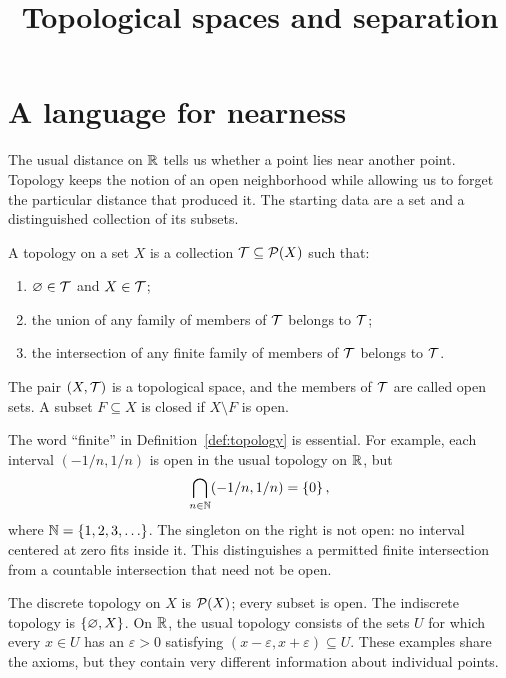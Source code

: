 \documentclass[11pt]{article}
\title{Topological spaces and separation}
\begin{document}
\maketitle

\section{A language for nearness}
The usual distance on $\mathbb{R}$ tells us whether a point lies near another
point. Topology keeps the notion of an open neighborhood while allowing us
to forget the particular distance that produced it. The starting data are
a set and a distinguished collection of its subsets.

\begin{definition}[Topology]\label{def:topology}
A topology on a set $X$ is a collection $\mathcal{T}\subseteq\mathcal{P}(X)$ such that:
\begin{enumerate}
  \item $\varnothing\in\mathcal{T}$ and $X\in\mathcal{T}$;
  \item the union of any family of members of $\mathcal{T}$ belongs to $\mathcal{T}$;
  \item the intersection of any finite family of members of $\mathcal{T}$ belongs to $\mathcal{T}$.
\end{enumerate}
The pair $(X,\mathcal{T})$ is a topological space, and the members of $\mathcal{T}$ are
called open sets. A subset $F\subseteq X$ is closed if $X\setminus F$ is open.
\end{definition}

The word ``finite'' in Definition~\ref{def:topology} is essential. For
example, each interval $(-1/n,1/n)$ is open in the usual topology on $\mathbb{R}$, but
\begin{equation}\label{eq:shrinking}
  \bigcap_{n\in\mathbb{N}}(-1/n,1/n)=\left\{0\right\},
\end{equation}
where $\mathbb{N}=\left\{1,2,3,\ldots\right\}$. The singleton on the right is not open: no
interval centered at zero fits inside it. This distinguishes a permitted
finite intersection from a countable intersection that need not be open.

\begin{example}
The discrete topology on $X$ is $\mathcal{P}(X)$; every subset is open.
The indiscrete topology is $\left\{\varnothing,X\right\}$. On $\mathbb{R}$, the usual
topology consists of the sets $U$ for which every $x\in U$ has an
$\varepsilon>0$ satisfying $(x-\varepsilon,x+\varepsilon)\subseteq U$.
These examples share the axioms, but they contain very different
information about individual points.
\end{example}
\end{document}
